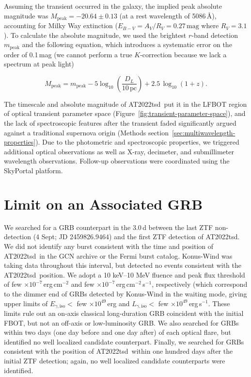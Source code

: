 \documentclass{nature_plusfigure}
\newcommand{\at}{AT2022tsd}
\begin{document}
\begin{methods}
Assuming the transient occurred in the galaxy, the implied peak absolute magnitude was $M_{\mathrm{peak}}=-20.64\pm0.13$ (at a rest wavelength of 5086\,\AA), accounting for Milky Way extinction ($E_{B-V}=A_V/R_V=0.27\,\mathrm{mag}$ where $R_V=3.1$)\cite{Finkbeiner1999,Schlegel1998,Schlafly2011}. To calculate the absolute magnitude, we used the brightest $r$-band detection $m_\mathrm{peak}$ and the following equation, which introduces a systematic error on the order of 0.1\,mag\cite{Whitesides2017} (we cannot perform a true $K$-correction because we lack a spectrum at peak light)

\begin{equation}
M_\mathrm{peak} = m_\mathrm{peak} - 5 \log_{10} \left( \frac{D_L}{10\,\mathrm{pc}} \right) + 2.5\,\log_{10} (1+z).
\end{equation}

The timescale and absolute magnitude of \at\ put it in the LFBOT region of optical transient parameter space (Figure~\ref{fig:transient-parameter-space}), and the lack of spectroscopic features after the transient faded significantly argued against a traditional supernova origin (Methods section~\ref{sec:multiwavelength-properties}). Due to the photometric and spectroscopic properties, we triggered additional optical observations as well as X-ray, decimeter, and submillimeter wavelength observations. Follow-up observations were coordinated using the SkyPortal\cite{vanderWalt2019,Coughlin2023} platform.

\section{Limit on an Associated GRB}
\label{sec:grbsearch}

We searched for a GRB counterpart in the 3.0\,d between the last ZTF non-detection (4 Sept; JD 2459826.9464) and the first ZTF detection of \at. We did not identify any burst consistent with the time and position of \at\ in the GCN archive or the Fermi burst catalog. Konus-Wind was taking data throughout this interval, but detected no events consistent with the \at\ position. 
We adopt a 10 keV--10 MeV fluence and peak flux threshold of few $\times10^{-7}$\,erg\,cm$^{-2}$ and few $\times10^{-7}$\,erg\,cm$^{-2}$\,s$^{-1}$,
respectively (which correspond to the dimmer end of GRBs detected by Konus-Wind in the waiting mode\cite{Tsvetkova2021},
giving upper limits of $E_{\gamma,\mathrm{iso}} <$ few $\times 10^{49}$\,erg and $L_{\gamma,\mathrm{iso}} <$ few $\times10^{49}$\,erg\,s$^{-1}$. 
These limits rule out an on-axis classical long-duration GRB coincident with the initial FBOT, but not an off-axis or low-luminosity GRB\cite{Cano2017}.
We also searched for GRBs within two days (one day before and one day after) of each optical flare, but identified no well localized candidate counterpart.
Finally, we searched for GRBs consistent with the position of \at\ within one hundred days after the initial ZTF detection; again, no well localized candidate counterparts were identified.


\end{methods}
\end{document}
